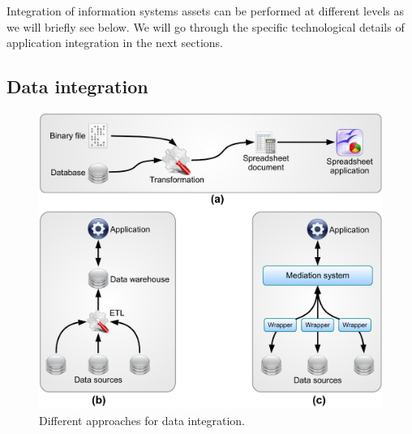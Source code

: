 Integration of information systems assets can be performed at different levels as we will briefly see below. We will go through the specific technological details of application integration in the next sections. \\


\subsection{Data integration}


\begin{figure}[htbp]
    \centering
    \includegraphics[width=\textwidth]{content/web-services/data-integration}
    \caption{Different approaches for data integration.}
    \label{fig:data-integration}
\end{figure}

